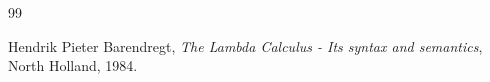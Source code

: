 \begin{thebibliography}{99}

Hendrik Pieter Barendregt, \textit{The Lambda Calculus - Its syntax and semantics}, North Holland, 1984.

\end{thebibliography}